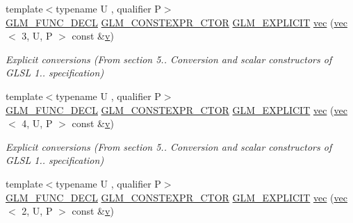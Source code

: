 \begin{DoxyCompactItemize}
\item 
{\footnotesize template$<$typename U , qualifier P$>$ }\\\mbox{\hyperlink{setup_8hpp_ab2d052de21a70539923e9bcbf6e83a51}{G\+L\+M\+\_\+\+F\+U\+N\+C\+\_\+\+D\+E\+CL}} \mbox{\hyperlink{setup_8hpp_ad34178a09666081abdb573c14d1f4a5a}{G\+L\+M\+\_\+\+C\+O\+N\+S\+T\+E\+X\+P\+R\+\_\+\+C\+T\+OR}} \mbox{\hyperlink{setup_8hpp_a6c74f5a5e7b134ab69023ff9a30d4d5d}{G\+L\+M\+\_\+\+E\+X\+P\+L\+I\+C\+IT}} \mbox{\hyperlink{structglm_1_1vec_3_012_00_01_t_00_01_q_01_4_a5b7cfdc305cd9c9cbedd6bdb8348e48c}{vec}} (\mbox{\hyperlink{structglm_1_1vec}{vec}}$<$ 3, U, P $>$ const \&\mbox{\hyperlink{_s_d_l__opengl_8h_a10a82eabcb59d2fcd74acee063775f90}{v}})
\begin{DoxyCompactList}\small\item\em Explicit conversions (From section 5.. Conversion and scalar constructors of G\+L\+SL 1.. specification) \end{DoxyCompactList}\item 
{\footnotesize template$<$typename U , qualifier P$>$ }\\\mbox{\hyperlink{setup_8hpp_ab2d052de21a70539923e9bcbf6e83a51}{G\+L\+M\+\_\+\+F\+U\+N\+C\+\_\+\+D\+E\+CL}} \mbox{\hyperlink{setup_8hpp_ad34178a09666081abdb573c14d1f4a5a}{G\+L\+M\+\_\+\+C\+O\+N\+S\+T\+E\+X\+P\+R\+\_\+\+C\+T\+OR}} \mbox{\hyperlink{setup_8hpp_a6c74f5a5e7b134ab69023ff9a30d4d5d}{G\+L\+M\+\_\+\+E\+X\+P\+L\+I\+C\+IT}} \mbox{\hyperlink{structglm_1_1vec_3_012_00_01_t_00_01_q_01_4_a2f77cbeba0c2efa024d10e348636c7c1}{vec}} (\mbox{\hyperlink{structglm_1_1vec}{vec}}$<$ 4, U, P $>$ const \&\mbox{\hyperlink{_s_d_l__opengl_8h_a10a82eabcb59d2fcd74acee063775f90}{v}})
\begin{DoxyCompactList}\small\item\em Explicit conversions (From section 5.. Conversion and scalar constructors of G\+L\+SL 1.. specification) \end{DoxyCompactList}\item 
{\footnotesize template$<$typename U , qualifier P$>$ }\\\mbox{\hyperlink{setup_8hpp_ab2d052de21a70539923e9bcbf6e83a51}{G\+L\+M\+\_\+\+F\+U\+N\+C\+\_\+\+D\+E\+CL}} \mbox{\hyperlink{setup_8hpp_ad34178a09666081abdb573c14d1f4a5a}{G\+L\+M\+\_\+\+C\+O\+N\+S\+T\+E\+X\+P\+R\+\_\+\+C\+T\+OR}} \mbox{\hyperlink{setup_8hpp_a6c74f5a5e7b134ab69023ff9a30d4d5d}{G\+L\+M\+\_\+\+E\+X\+P\+L\+I\+C\+IT}} \mbox{\hyperlink{structglm_1_1vec_3_012_00_01_t_00_01_q_01_4_a55d77d8b7320875815bfe34fd59823af}{vec}} (\mbox{\hyperlink{structglm_1_1vec}{vec}}$<$ 2, U, P $>$ const \&\mbox{\hyperlink{_s_d_l__opengl_8h_a10a82eabcb59d2fcd74acee063775f90}{v}})

\end{DoxyCompactItemize}
